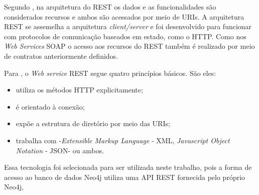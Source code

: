 Segundo , na arquitetura do REST os dados e as funcionalidades são considerados recursos e ambos são acessados por meio de  URIs\footnotemark[23]. A arquitetura REST se assemelha a arquitetura \textit{client/server} e foi desenvolvido para funcionar com protocolos de comunicação baseados em estado, como o HTTP. Como nos \textit{Web Services} SOAP o acesso aos recursos do REST também é realizado por meio de contratos anteriormente definidos.


Para , o \textit{Web service} REST segue quatro princípios básicos. São eles: 

\begin{itemize}
	\item utiliza os métodos HTTP explicitamente;
	\item é orientado à conexão;
	\item expõe a estrutura de diretório por meio das URIs;
	\item trabalha com -\textit{Extensible Markup Language} - XML\footnotemark[24], \textit{Javascript Object Notation} - JSON\footnotemark[25] - ou ambos.
\end{itemize}



Essa tecnologia foi selecionada para ser utilizada neste trabalho, pois a forma de acesso ao banco de dados Neo4j utiliza uma API REST fornecida pelo próprio Neo4j,